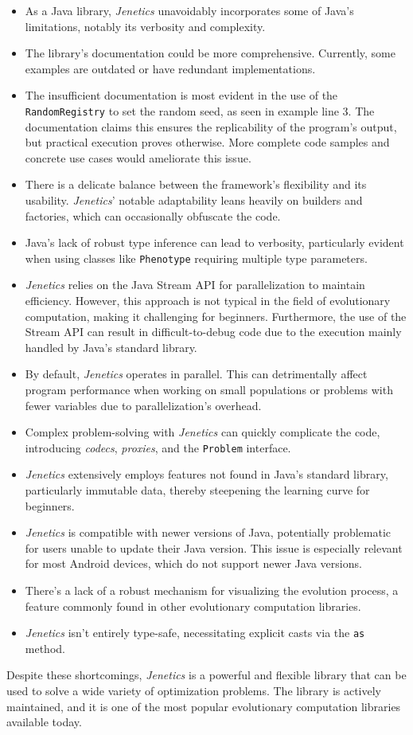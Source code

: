   \begin{itemize}
    \item As a Java library, \textit{Jenetics} unavoidably incorporates some of Java's limitations, notably its verbosity and complexity.
    \item The library's documentation could be more comprehensive. Currently, some examples are outdated or have redundant implementations.
    \item The insufficient documentation is most evident in the use of the \texttt{RandomRegistry} to set the random seed, as seen in example line 3. The documentation claims this ensures the replicability of the program's output, but practical execution proves otherwise. More complete code samples and concrete use cases would ameliorate this issue.
    \item There is a delicate balance between the framework's flexibility and its usability. \textit{Jenetics}' notable adaptability leans heavily on builders and factories, which can occasionally obfuscate the code.
    \item Java's lack of robust type inference can lead to verbosity, particularly evident when using classes like \texttt{Phenotype} requiring multiple type parameters.
    \item \textit{Jenetics} relies on the Java Stream API for parallelization to maintain efficiency. However, this approach is not typical in the field of evolutionary computation, making it challenging for beginners. Furthermore, the use of the Stream API can result in difficult-to-debug code due to the execution mainly handled by Java's standard library.
    \item By default, \textit{Jenetics} operates in parallel. This can detrimentally affect program performance when working on small populations or problems with fewer variables due to parallelization's overhead.
    \item Complex problem-solving with \textit{Jenetics} can quickly complicate the code, introducing \textit{codecs}, \textit{proxies}, and the \texttt{Problem} interface.
    \item \textit{Jenetics} extensively employs features not found in Java's standard library, particularly immutable data, thereby steepening the learning curve for beginners.
    \item \textit{Jenetics} is compatible with newer versions of Java, potentially problematic for users unable to update their Java version. This issue is especially relevant for most Android devices, which do not support newer Java versions.
    \item There's a lack of a robust mechanism for visualizing the evolution process, a feature commonly found in other evolutionary computation libraries.
    \item \textit{Jenetics} isn't entirely type-safe, necessitating explicit casts via the \texttt{as} method.
  \end{itemize}

  Despite these shortcomings, \textit{Jenetics} is a powerful and flexible
  library that can be used to solve a wide variety of optimization problems.
  The library is actively maintained, and it is one of the most popular
  evolutionary computation libraries available today.
